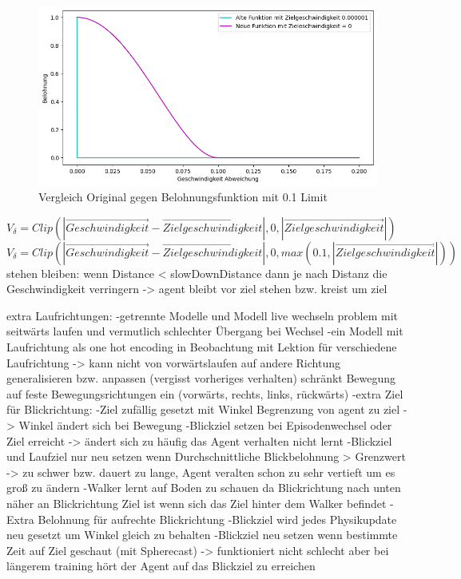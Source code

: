 \begin{figure}[H]
  \centering  
  \includegraphics[scale=0.5]{img/match_velocity_vergleich_clip.png}
  \caption{Vergleich Original gegen Belohnungsfunktion mit 0.1 Limit}
  \label{fig:match_velocity_vergleich_clip}
\end{figure}
$V_\delta=Clip(|\vec{Geschwindigkeit} - \vec{Zielgeschwindigkeit}|, 0, |\vec{Zielgeschwindigkeit}|)$ \\
$V_\delta=Clip(|\vec{Geschwindigkeit} - \vec{Zielgeschwindigkeit}|, 0, max(0.1, |\vec{Zielgeschwindigkeit}|))$ \\



stehen bleiben:
wenn Distance < slowDownDistance dann je nach Distanz die Geschwindigkeit verringern -> agent bleibt vor ziel stehen bzw. kreist um ziel

extra Laufrichtungen:
-getrennte Modelle und Modell live wechseln problem mit seitwärts laufen und vermutlich schlechter Übergang bei Wechsel
-ein Modell mit Laufrichtung als one hot encoding in Beobachtung mit Lektion für verschiedene Laufrichtung -> kann nicht von vorwärtslaufen auf andere Richtung generalisieren bzw. anpassen (vergisst vorheriges verhalten) schränkt Bewegung auf feste Bewegungsrichtungen ein (vorwärts, rechts, links, rückwärts)
-extra Ziel für Blickrichtung:
  -Ziel zufällig gesetzt mit Winkel Begrenzung von agent zu ziel -> Winkel ändert sich bei Bewegung
  -Blickziel setzen bei Episodenwechsel oder Ziel erreicht -> ändert sich zu häufig das Agent verhalten nicht lernt
  -Blickziel und Laufziel nur neu setzen wenn Durchschnittliche Blickbelohnung > Grenzwert -> zu schwer bzw. dauert zu lange, Agent veralten schon zu sehr vertieft um es groß zu ändern
  -Walker lernt auf Boden zu schauen da Blickrichtung nach unten näher an Blickrichtung Ziel ist wenn sich das Ziel hinter dem Walker befindet
  -Extra Belohnung für aufrechte Blickrichtung
  -Blickziel wird jedes Physikupdate neu gesetzt um Winkel gleich zu behalten
  -Blickziel neu setzen wenn bestimmte Zeit auf Ziel geschaut (mit Spherecast) -> funktioniert nicht schlecht aber bei längerem training hört der Agent auf das Blickziel zu erreichen